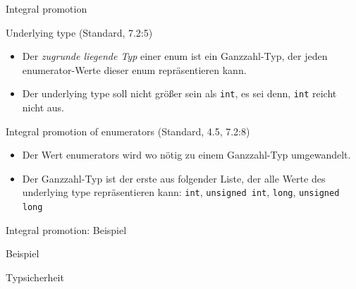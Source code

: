 \begin{frame}[fragile]{Integral promotion}
	\begin{block}{Underlying type (Standard, 7.2:5)}
		\begin{itemize}
			\item Der \emph{zugrunde liegende Typ} einer enum ist ein Ganzzahl-Typ, der jeden enumerator-Werte dieser enum repräsentieren kann.
			\item Der underlying type soll nicht größer sein als \verb|int|, es sei denn, \verb|int| reicht nicht aus.
		\end{itemize}
	\end{block}
	
	\pause
	
	\begin{block}{Integral promotion of enumerators (Standard, 4.5, 7.2:8)}
		\begin{itemize}
			\item Der Wert enumerators wird wo nötig zu einem Ganzzahl-Typ umgewandelt.
			\item Der Ganzzahl-Typ ist der erste aus folgender Liste, der alle Werte des underlying type repräsentieren kann: \verb|int|, \verb|unsigned int|, \verb|long|, \verb|unsigned long|
		\end{itemize}
	\end{block}
\end{frame}

\begin{frame}{Integral promotion: Beispiel}
	\begin{block}{Beispiel}
		\footnotesize
		
		
	\end{block}
	
	\pause
	
	\begin{block}{Typsicherheit}
		\footnotesize
		
		\begin{columns}[t]
			
			
			
		\end{columns}
	\end{block}
\end{frame}


